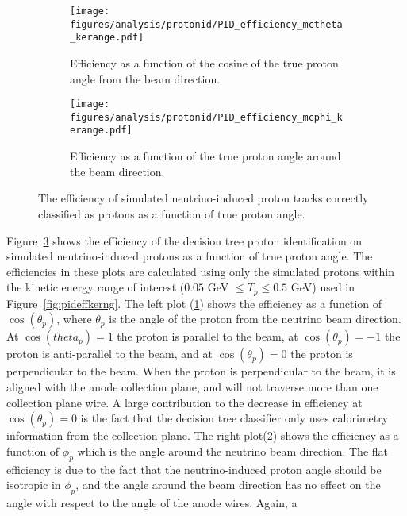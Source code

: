     \begin{figure}[h]
      \centering
      \begin{subfigure}[t]{2.5in}
        \texttt{[image: figures/analysis/protonid/PID\_efficiency\_mctheta\_kerange.pdf]}
        \caption{Efficiency as a function of the cosine of the true proton
          angle from the beam direction.}
        \label{fig:pideffangletheta}
      \end{subfigure}
      \hspace{2pt}
      \begin{subfigure}[t]{2.5in}
        \texttt{[image: figures/analysis/protonid/PID\_efficiency\_mcphi\_kerange.pdf]}
        \caption{Efficiency as a function of the true proton angle around the beam direction.}
        \label{fig:pideffanglephi}
      \end{subfigure}
      \caption{The efficiency of simulated neutrino-induced proton tracks
        correctly classified as protons as a function of true proton angle.}
      \label{fig:pideffangle}
    \end{figure}
    Figure~\ref{fig:pideffangle} shows the efficiency of the decision tree proton
    identification on simulated neutrino-induced protons as a function of true
    proton angle. The efficiencies in these plots are calculated using only the
    simulated protons within the kinetic energy range of interest ($0.05$ GeV
    $\le T_p \le 0.5$ GeV) used in Figure~\ref{fig:pideffkerng}. The left plot
    (\ref{fig:pideffangletheta}) shows the efficiency as a function of
    $\cos(\theta_p)$, where $\theta_p$ is the angle of the proton from the
    neutrino beam direction. At $\cos(theta_p) = 1$ the proton is parallel to
    the beam, at $\cos(\theta_p) = -1$ the proton is anti-parallel to the beam,
    and at $\cos(\theta_p) = 0$ the proton is perpendicular to the beam. When
    the proton is perpendicular to the beam, it is aligned with the anode
    collection plane, and will not traverse more than one collection plane
    wire. A large contribution to the decrease in efficiency at $\cos(\theta_p)
    = 0$ is the fact that the decision tree classifier only uses calorimetry
    information from the collection plane. The right
    plot(\ref{fig:pideffanglephi}) shows the efficiency as a function of
    $\phi_p$ which is the angle around the neutrino beam direction. The flat
    efficiency is due to the fact that the neutrino-induced proton angle should
    be isotropic in $\phi_p$, and the angle around the beam direction has no
    effect on the angle with respect to the angle of the anode wires. Again, a
